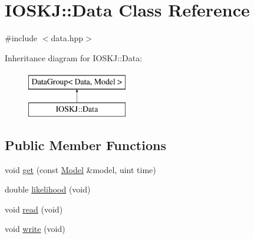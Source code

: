 \hypertarget{classIOSKJ_1_1Data}{\section{I\-O\-S\-K\-J\-:\-:Data Class Reference}
\label{classIOSKJ_1_1Data}
}


{\ttfamily \#include $<$data.\-hpp$>$}

Inheritance diagram for I\-O\-S\-K\-J\-:\-:Data\-:\begin{figure}[H]
\begin{center}
\leavevmode
\includegraphics[height=2.000000cm]{classIOSKJ_1_1Data}
\end{center}
\end{figure}
\subsection*{Public Member Functions}
\begin{DoxyCompactItemize}
\item 
void \hyperlink{classIOSKJ_1_1Data_a36ad666102014528bb511c680cc0db27}{get} (const \hyperlink{classIOSKJ_1_1Model}{Model} \&model, uint time)
\item 
double \hyperlink{classIOSKJ_1_1Data_af00399104402b9bbd8d01292f8b28e17}{likelihood} (void)
\item 
void \hyperlink{classIOSKJ_1_1Data_afbfbcac4c122782aace3315096e8b402}{read} (void)
\item 
void \hyperlink{classIOSKJ_1_1Data_ab5f18a8f4dfc4b720599f066c717ecae}{write} (void)
\end{DoxyCompactItemize}
